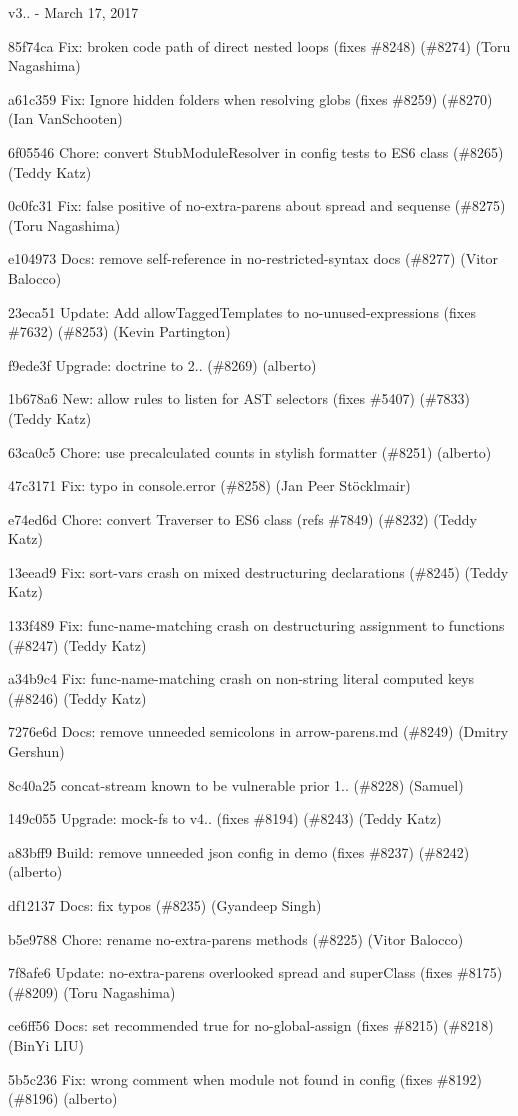 v3.. -\/ March 17, 2017


\begin{DoxyItemize}
\item 85f74ca Fix\+: broken code path of direct nested loops (fixes \#8248) (\#8274) (Toru Nagashima)
\item a61c359 Fix\+: Ignore hidden folders when resolving globs (fixes \#8259) (\#8270) (Ian Van\+Schooten)
\item 6f05546 Chore\+: convert Stub\+Module\+Resolver in config tests to ES6 class (\#8265) (Teddy Katz)
\item 0c0fc31 Fix\+: false positive of no-\/extra-\/parens about spread and sequense (\#8275) (Toru Nagashima)
\item e104973 Docs\+: remove self-\/reference in no-\/restricted-\/syntax docs (\#8277) (Vitor Balocco)
\item 23eca51 Update\+: Add allow\+Tagged\+Templates to no-\/unused-\/expressions (fixes \#7632) (\#8253) (Kevin Partington)
\item f9ede3f Upgrade\+: doctrine to 2.. (\#8269) (alberto)
\item 1b678a6 New\+: allow rules to listen for AST selectors (fixes \#5407) (\#7833) (Teddy Katz)
\item 63ca0c5 Chore\+: use precalculated counts in stylish formatter (\#8251) (alberto)
\item 47c3171 Fix\+: typo in console.\+error (\#8258) (Jan Peer Stöcklmair)
\item e74ed6d Chore\+: convert Traverser to ES6 class (refs \#7849) (\#8232) (Teddy Katz)
\item 13eead9 Fix\+: sort-\/vars crash on mixed destructuring declarations (\#8245) (Teddy Katz)
\item 133f489 Fix\+: func-\/name-\/matching crash on destructuring assignment to functions (\#8247) (Teddy Katz)
\item a34b9c4 Fix\+: func-\/name-\/matching crash on non-\/string literal computed keys (\#8246) (Teddy Katz)
\item 7276e6d Docs\+: remove unneeded semicolons in arrow-\/parens.\+md (\#8249) (Dmitry Gershun)
\item 8c40a25 concat-\/stream known to be vulnerable prior 1.. (\#8228) (Samuel)
\item 149c055 Upgrade\+: mock-\/fs to v4.. (fixes \#8194) (\#8243) (Teddy Katz)
\item a83bff9 Build\+: remove unneeded json config in demo (fixes \#8237) (\#8242) (alberto)
\item df12137 Docs\+: fix typos (\#8235) (Gyandeep Singh)
\item b5e9788 Chore\+: rename no-\/extra-\/parens methods (\#8225) (Vitor Balocco)
\item 7f8afe6 Update\+: no-\/extra-\/parens overlooked spread and super\+Class (fixes \#8175) (\#8209) (Toru Nagashima)
\item ce6ff56 Docs\+: set recommended true for no-\/global-\/assign (fixes \#8215) (\#8218) (Bin\+Yi LIU)
\item 5b5c236 Fix\+: wrong comment when module not found in config (fixes \#8192) (\#8196) (alberto)
\end{DoxyItemize}

